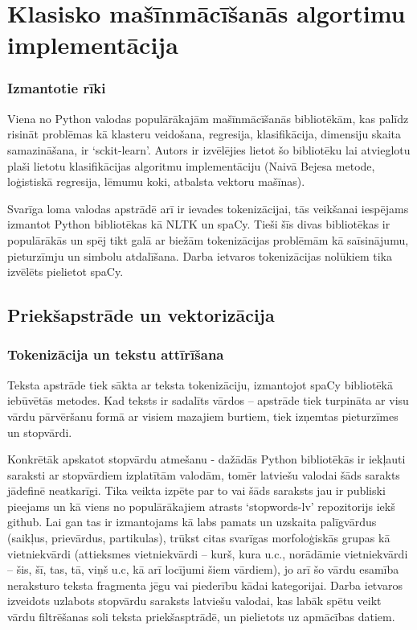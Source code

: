 \section{Klasisko mašīnmācīšanās algortimu implementācija}

\subsubsection{Izmantotie rīki}
Viena no Python valodas populārākajām mašīnmācīšanās bibliotēkām, kas palīdz risināt problēmas kā klasteru veidošana, regresija, klasifikācija, dimensiju skaita samazināšana, ir ‘sckit-learn’. Autors ir izvēlējies lietot šo bibliotēku lai atvieglotu plaši lietotu klasifikācijas algoritmu implementāciju (Naivā Bejesa metode, loģistiskā regresija, lēmumu koki,  atbalsta vektoru mašīnas). 

Svarīga loma valodas apstrādē arī ir ievades tokenizācijai, tās veikšanai iespējams izmantot Python bibliotēkas kā NLTK un spaCy. Tieši šīs divas bibliotēkas ir populārākās un spēj tikt galā ar biežām tokenizācijas problēmām kā saīsinājumu, pieturzīmju un simbolu atdalīšana. Darba ietvaros tokenizācijas nolūkiem tika izvēlēts pielietot spaCy.

\subsection{Priekšapstrāde un vektorizācija}
\subsubsection{Tokenizācija un tekstu attīrīšana}
Teksta apstrāde tiek sākta ar teksta tokenizāciju, izmantojot spaCy bibliotēkā iebūvētās metodes. Kad teksts ir sadalīts vārdos – apstrāde tiek turpināta ar visu vārdu pārvēršanu formā ar visiem mazajiem burtiem, tiek izņemtas pieturzīmes un stopvārdi.

Konkrētāk apskatot stopvārdu atmešanu - dažādās Python bibliotēkās ir iekļauti saraksti ar stopvārdiem izplatītām valodām, tomēr latviešu valodai šāds sarakts jādefinē neatkarīgi. Tika veikta izpēte par to vai šāds saraksts jau ir publiski pieejams un kā viens no populārākajiem atrasts ‘stopwords-lv’ repozitorijs iekš github. Lai gan tas ir izmantojams kā labs pamats un uzskaita palīgvārdus (saikļus, prievārdus, partikulas), trūkst citas svarīgas morfoloģiskās grupas kā vietniekvārdi (attieksmes vietniekvārdi – kurš, kura u.c., norādāmie vietniekvārdi – šis, šī, tas, tā, viņš u.c, kā arī locījumi šiem vārdiem), jo arī šo vārdu esamība neraksturo teksta fragmenta jēgu vai piederību kādai kategorijai. Darba ietvaros izveidots uzlabots stopvārdu saraksts latviešu valodai, kas labāk spētu veikt vārdu filtrēšanas soli teksta priekšasptrādē, un pielietots uz apmācības datiem. 


